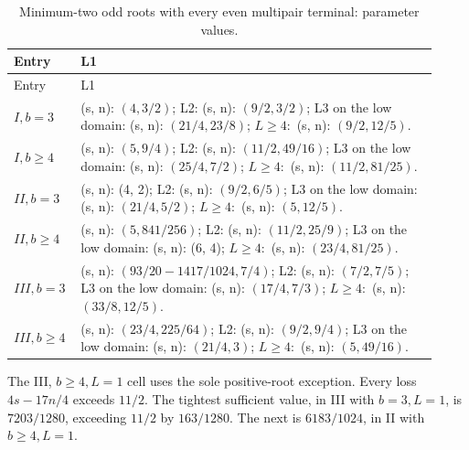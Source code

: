 \begingroup\small
\setlength{\tabcolsep}{3pt}
\setlength{\LTleft}{0pt}\setlength{\LTright}{\fill}
\begin{longtable}{@{}p{0.1200\linewidth}p{0.8000\linewidth}@{}}
\caption{Minimum-two odd roots with every even multipair terminal: parameter values.}\label{tab:parameters:r2-c003:6}\\
\toprule
Entry & L1 \\
\midrule\endfirsthead
\toprule
Entry & L1 \\
\midrule\endhead
\bottomrule\endfoot
\(I,\allowbreak b=3\) & (s, n): \((4,\allowbreak 3/2)\); L2: (s, n): \((9/2,\allowbreak 3/2)\); L3 on the low domain: (s, n): \((21/4,\allowbreak 23/8)\); \(L\ge 4:\) (s, n): \((9/2,\allowbreak 12/5)\). \\
\addlinespace[2pt]
\(I,\allowbreak b\ge 4\) & (s, n): \((5,\allowbreak 9/4)\); L2: (s, n): \((11/2,\allowbreak 49/16)\); L3 on the low domain: (s, n): \((25/4,\allowbreak 7/2)\); \(L\ge 4:\) (s, n): \((11/2,\allowbreak 81/25)\). \\
\addlinespace[2pt]
\(II,\allowbreak b=3\) & (s, n): (4, 2); L2: (s, n): \((9/2,\allowbreak 6/5)\); L3 on the low domain: (s, n): \((21/4,\allowbreak 5/2)\); \(L\ge 4:\) (s, n): \((5,\allowbreak 12/5)\). \\
\addlinespace[2pt]
\(II,\allowbreak b\ge 4\) & (s, n): \((5,\allowbreak 841/256)\); L2: (s, n): \((11/2,\allowbreak 25/9)\); L3 on the low domain: (s, n): (6, 4); \(L\ge 4:\) (s, n): \((23/4,\allowbreak 81/25)\). \\
\addlinespace[2pt]
\(III,\allowbreak b=3\) & (s, n): \((93/20-1417/1024,\allowbreak 7/4)\); L2: (s, n): \((7/2,\allowbreak 7/5)\); L3 on the low domain: (s, n): \((17/4,\allowbreak 7/3)\); \(L\ge 4:\) (s, n): \((33/8,\allowbreak 12/5)\). \\
\addlinespace[2pt]
\(III,\allowbreak b\ge 4\) & (s, n): \((23/4,\allowbreak 225/64)\); L2: (s, n): \((9/2,\allowbreak 9/4)\); L3 on the low domain: (s, n): \((21/4,\allowbreak 3)\); \(L\ge 4:\) (s, n): \((5,\allowbreak 49/16)\). \\
\end{longtable}
\endgroup


The III, \(b\ge4,\allowbreak \allowbreak  L=1\) cell uses the sole positive-root exception. Every loss \(4s-17n/4\) exceeds \(11/2\). The tightest sufficient value, in III with \(b=3,\allowbreak \allowbreak  L=1\), is \(7203/1280\), exceeding \(11/2\) by \(163/1280\). The next is \(6183/1024\), in II with \(b\ge4,\allowbreak \allowbreak  L=1\).

